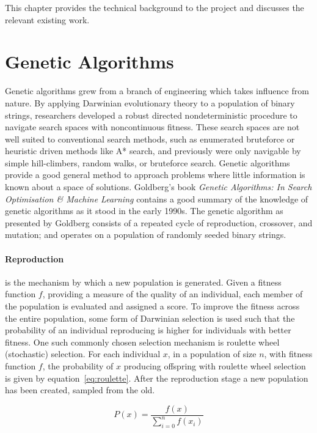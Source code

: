 This chapter provides the technical background to the project and discusses
the relevant existing work.

\section{Genetic Algorithms \label{s:genetic}}
Genetic algorithms grew from a branch of engineering which takes influence from
nature. By applying Darwinian evolutionary theory to a population of binary strings,
researchers developed
a robust directed nondeterministic procedure to navigate search spaces with noncontinuous
fitness. These search spaces are not well suited to conventional search methods,
such as enumerated bruteforce or heuristic driven methods like A* search,
and previously were only navigable by simple hill-climbers, random walks, or bruteforce search.
Genetic algorithms provide a good general method to approach problems where
little information is known about a space of solutions.
Goldberg's book {\em Genetic Algorithms: In Search Optimisation \& Machine
Learning} \cite{Goldberg:1989:GAS:534133} contains a good summary of the knowledge
of genetic algorithms as it stood in the early 1990s.
The genetic algorithm as presented by Goldberg consists
of a repeated cycle of reproduction, crossover, and mutation; and operates on a
population of randomly seeded binary strings.

\paragraph{Reproduction}
is the mechanism by which a new population is generated. Given a fitness function
$f$, providing a measure of the quality of an individual, each member of the
population is evaluated and
assigned a score. To improve the fitness across the entire population, some form
of Darwinian selection is used such that the probability of an individual
reproducing is higher for individuals with better fitness.
One such commonly chosen selection mechanism is roulette wheel (stochastic) selection.
For each individual $x$, in a population of size $n$, with fitness function $f$,
the probability of $x$ producing offspring with roulette wheel
selection is given by equation~\ref{eq:roulette}. After the reproduction
stage a new population has been created, sampled from the old.

\begin{equation}
	P(x) = \frac{f(x)}{\sum_{i=0}^{n}f(x_{i})}
	\label{eq:roulette}
\end{equation}

